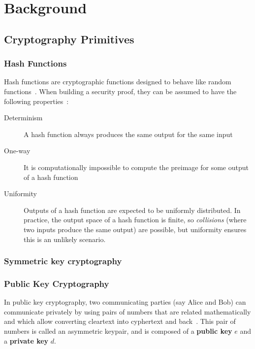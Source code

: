 \chapter{Background}\label{ch:background}


\section{Cryptography Primitives}\label{sec:cryptography}

\subsection{Hash Functions}\label{subsec:crypto:hash}

Hash functions are cryptographic functions designed to behave like random
functions~\cite{smart2016randomOracleModel}.
When building a security proof, they can be assumed to have the following properties~\cite{smart2016randomOracleModel,
    smart2016hashFunctions}:
\begin{description}
    \item[Determinism] A hash function always produces the same output for the same input
    \item[One-way] It is computationally impossible to compute the preimage for some output of a hash function
    \item[Uniformity] Outputs of a hash function are expected to be uniformly distributed.
    In practice, the output space of a hash function is finite, so \textit{collisions} (where two inputs produce the
    same output) are possible, but uniformity ensures this is an unlikely scenario.
\end{description}

\subsection{Symmetric key cryptography}


\subsection{Public Key Cryptography}\label{subsec:crypto:pubkey}

In public key cryptography, two communicating parties (say Alice and Bob) can communicate privately by using pairs of
numbers that are related mathematically and which allow converting cleartext into cyphertext and
back~\cite{smart2016publicKey}.
This pair of numbers is called an asymmetric keypair, and is composed of a \textbf{public key} $e$ and a \textbf{private
key} $d$.\\

